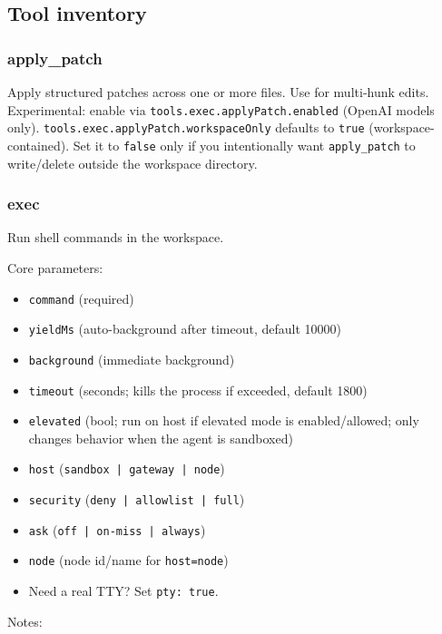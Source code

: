 \subsection{Tool inventory}


\subsubsection{apply\_patch}


Apply structured patches across one or more files. Use for multi-hunk edits.
Experimental: enable via \texttt{tools.exec.applyPatch.enabled} (OpenAI models only).
\texttt{tools.exec.applyPatch.workspaceOnly} defaults to \texttt{true} (workspace-contained). Set it to \texttt{false} only if you intentionally want \texttt{apply\_patch} to write/delete outside the workspace directory.

\subsubsection{exec}


Run shell commands in the workspace.

Core parameters:

\begin{itemize}
  \item \texttt{command} (required)
  \item \texttt{yieldMs} (auto-background after timeout, default 10000)
  \item \texttt{background} (immediate background)
  \item \texttt{timeout} (seconds; kills the process if exceeded, default 1800)
  \item \texttt{elevated} (bool; run on host if elevated mode is enabled/allowed; only changes behavior when the agent is sandboxed)
  \item \texttt{host} (\texttt{sandbox | gateway | node})
  \item \texttt{security} (\texttt{deny | allowlist | full})
  \item \texttt{ask} (\texttt{off | on-miss | always})
  \item \texttt{node} (node id/name for \texttt{host=node})
  \item Need a real TTY? Set \texttt{pty: true}.
\end{itemize}


Notes:

